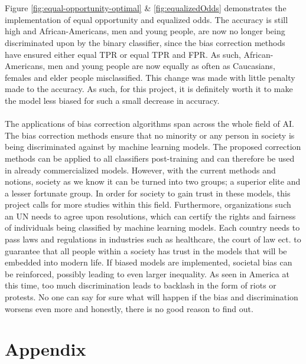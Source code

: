 \documentclass[11pt, fleqn, titlepage]{article}
\begin{document}
	\\\\
	Figure \ref{fig:equal-opportunity-optimal} \& \ref{fig:equalizedOdds} demonstrates the implementation of equal opportunity and equalized odds. The accuracy is still high and African-Americans, men and young people, are now no longer being discriminated upon by the binary classifier, since the bias correction methods have ensured either equal TPR or equal TPR and FPR. As such, African-Americans, men and young people are now equally as often as Caucasians, females and elder people misclassified. This change was made with little penalty made to the accuracy. As such, for this project, it is definitely worth it to make the model less biased for such a small decrease in accuracy. 
	\\\\
	The applications of bias correction algorithms span across the whole field of AI. The bias correction methods ensure that no minority or any person in society is being discriminated against by machine learning models. The proposed correction methods can be applied to all classifiers post-training and can therefore be used in already commercialized models. However, with the current methods and notions, society as we know it can be turned into two groups; a superior elite and a lesser fortunate group. In order for society to gain trust in these models, this project calls for more studies within this field. Furthermore, organizations such an UN needs to agree upon resolutions, which can certify the rights and fairness of individuals being classified by machine learning models. Each country needs to pass laws and regulations in industries such as healthcare, the court of law ect. to guarantee that all people within a society has trust in the models that will be embedded into modern life. If biased models are implemented, societal bias can be reinforced, possibly leading to even larger inequality. As seen in America at this time, too much discrimination leads to backlash in the form of riots or protests. No one can say for sure what will happen if the bias and discrimination worsens even more and honestly, there is no good reason to find out.
	
	
	\section{Appendix} \label{appendix}
	
%	
\end{document}
